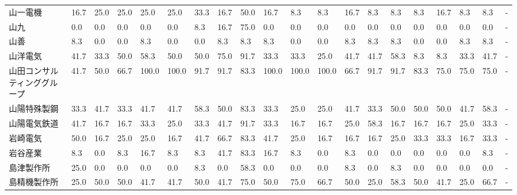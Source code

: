 \documentclass[a4paper，11pt]{jsarticle}
\begin{document}
\begin{longtable}[c]{lp{3mm}p{3mm}p{3mm}p{3mm}p{3mm}p{3mm}p{3mm}p{3mm}p{3mm}p{3mm}p{3mm}p{3mm}p{3mm}p{3mm}p{3mm}p{3mm}p{3mm}p{3mm}p{3mm}}
山一電機            &   16.7 &   25.0 &      25.0 &      25.0 &       25.0 &   33.3 &   16.7 &   50.0 &    16.7 &     8.3 &    8.3 &  16.7 &    8.3 &     8.3 &     8.3 &  16.7 &   8.3 &   8.3 &     - \\
山九              &    0.0 &    0.0 &       0.0 &       0.0 &        0.0 &    8.3 &   16.7 &   75.0 &     0.0 &     0.0 &    0.0 &   0.0 &    0.0 &     0.0 &     0.0 &   0.0 &   0.0 &   0.0 &     - \\
山善              &    8.3 &    0.0 &       0.0 &       8.3 &        0.0 &    0.0 &    8.3 &    8.3 &     8.3 &     0.0 &    0.0 &   8.3 &    8.3 &     8.3 &     0.0 &   0.0 &   8.3 &   8.3 &     - \\
山洋電気            &   41.7 &   33.3 &      50.0 &      58.3 &       50.0 &   50.0 &   75.0 &   91.7 &    33.3 &    33.3 &   25.0 &  41.7 &   41.7 &    58.3 &     8.3 &   8.3 &  33.3 &  41.7 &     - \\
山田コンサルティンググループ  &   41.7 &   50.0 &      66.7 &     100.0 &      100.0 &   91.7 &   91.7 &   83.3 &   100.0 &   100.0 &  100.0 &  66.7 &   91.7 &    91.7 &    83.3 &  75.0 &  75.0 &  75.0 &     - \\
山陽特殊製鋼          &   33.3 &   41.7 &      33.3 &      41.7 &       41.7 &   58.3 &   50.0 &   83.3 &    33.3 &    25.0 &   25.0 &  41.7 &   33.3 &    50.0 &    50.0 &  50.0 &  41.7 &  58.3 &     - \\
山陽電気鉄道          &   41.7 &   16.7 &      16.7 &      33.3 &       25.0 &   33.3 &   41.7 &   91.7 &    33.3 &    16.7 &   16.7 &  25.0 &   58.3 &    16.7 &    16.7 &  16.7 &  25.0 &  33.3 &     - \\
岩崎電気            &   50.0 &   16.7 &      25.0 &      25.0 &       16.7 &   41.7 &   66.7 &   83.3 &    41.7 &    25.0 &   16.7 &  16.7 &   16.7 &    25.0 &    33.3 &  33.3 &  16.7 &  33.3 &     - \\
岩谷産業            &    8.3 &    0.0 &       8.3 &      16.7 &        8.3 &    8.3 &   41.7 &   83.3 &    16.7 &     8.3 &    0.0 &   8.3 &    0.0 &     0.0 &     0.0 &   0.0 &   0.0 &   8.3 &     - \\
島津製作所           &   25.0 &    0.0 &       0.0 &       0.0 &        0.0 &    8.3 &    0.0 &   58.3 &     0.0 &     0.0 &    0.0 &   8.3 &    0.0 &     8.3 &     0.0 &   0.0 &   0.0 &   0.0 &     - \\
島精機製作所          &   25.0 &   50.0 &      50.0 &      41.7 &       41.7 &   50.0 &   41.7 &   75.0 &    50.0 &    75.0 &   66.7 &  50.0 &   25.0 &    58.3 &    50.0 &  41.7 &  25.0 &  66.7 &     - \\

\end{longtable}
\end{document}
